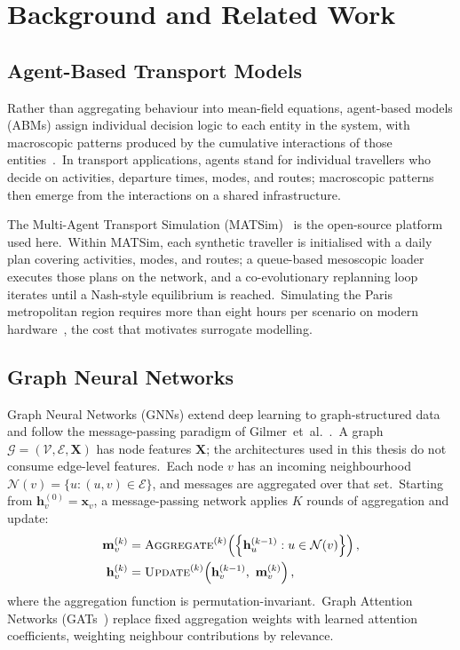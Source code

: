 
\chapter{Background and Related Work}\label{chapter:background}

\section{Agent-Based Transport Models}\label{sec:abm}

Rather than aggregating behaviour into mean-field equations, agent-based models (ABMs) assign individual decision logic to each entity in the system, with macroscopic patterns produced by the cumulative interactions of those entities~\cite{bonabeau2002agent,railsback2019agent}.\ In transport applications, agents stand for individual travellers who decide on activities, departure times, modes, and routes; macroscopic patterns then emerge from the interactions on a shared infrastructure.

The Multi-Agent Transport Simulation (MATSim)~\cite{horni2016matsim} is the open-source platform used here.\ Within MATSim, each synthetic traveller is initialised with a daily plan covering activities, modes, and routes; a queue-based mesoscopic loader executes those plans on the network, and a co-evolutionary replanning loop iterates until a Nash-style equilibrium is reached.\ Simulating the Paris metropolitan region requires more than eight hours per scenario on modern hardware~\cite{natterer2025ml}, the cost that motivates surrogate modelling.

\section{Graph Neural Networks}\label{sec:gnn}

Graph Neural Networks (GNNs) extend deep learning to graph-structured data~\cite{scarselli2009graph,kipf2017semi,wu2020comprehensive,wu2022graph} and follow the message-passing paradigm of Gilmer~et~al.~\cite{gilmer2017neural}.\ A graph $\mathcal{G} = (\mathcal{V}, \mathcal{E}, \mathbf{X})$ has node features $\mathbf{X}$; the architectures used in this thesis do not consume edge-level features.\ Each node $v$ has an incoming neighbourhood $\mathcal{N}(v) = \{u : (u,v) \in \mathcal{E}\}$, and messages are aggregated over that set.\ Starting from $\mathbf{h}_v^{(0)} = \mathbf{x}_v$, a message-passing network applies $K$ rounds of aggregation and update:
\begin{align}
 \mathbf{m}_v^{(k)} &= \textsc{Aggregate}^{(k)}\!\left(\left\{\mathbf{h}_u^{(k-1)} : u \in \mathcal{N}(v)\right\}\right), \label{eq:aggregate}\\
 \mathbf{h}_v^{(k)} &= \textsc{Update}^{(k)}\!\left(\mathbf{h}_v^{(k-1)},\ \mathbf{m}_v^{(k)}\right), \label{eq:update}
\end{align}
where the aggregation function is permutation-invariant.\ Graph Attention Networks (GATs~\cite{velickovic2018graph}) replace fixed aggregation weights with learned attention coefficients, weighting neighbour contributions by relevance.

